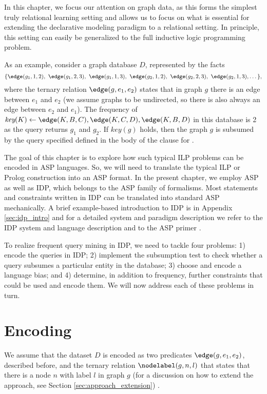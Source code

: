 In this chapter, we focus our attention on graph data, as this forms the simplest truly relational learning setting and allows us to focus on what is essential for extending the declarative modeling paradigm to a relational setting. In principle, this setting can easily be generalized to the full inductive logic programming problem. 
 
As an example, consider a graph database $D$, represented by the facts 
\begin{equation*}
\{ \edge(g_1,1,2),~ \edge(g_1,2,3),~ \edge(g_1,1,3),~ \edge(g_2,1,2),~ \edge(g_2,2,3),~ \edge(g_2,1,3), \dots \},
\end{equation*}
where the ternary relation $\edge(g,e_1,e_2)$ states that in graph $g$ there is an edge between $e_1$ and $e_2$ (we assume graphs to be undirected, so there is also always an edge between $e_2$ and $e_1$). The frequency of $\textit{key}(K) \leftarrow \edge(K,B,C), \edge(K,C,D), \edge(K,B,D)$ in this database is 2 as the query returns $g_1$ and $g_2$. If $key(g)$ holds,  then the graph $g$ is subsumed by the query specified defined in the body of the clause for \keypred.

The goal of this chapter is to explore how such typical ILP problems can be encoded in 
ASP languages.   So, we will need to translate the typical ILP or Prolog construction into an ASP format. 
In the present chapter, we employ ASP as well as IDP, which belongs to the ASP family of formalisms. Most statements and constraints written in IDP can be translated into standard ASP mechanically. %
A brief example-based introduction to IDP is in Appendix \ref{sec:idp_intro} and for a detailed system and paradigm description we refer to the IDP system and language description \parencite{idp} and to the ASP primer \parencite{eiter}.

To realize frequent query mining in IDP, we need to tackle four problems: 1) encode the queries in IDP; 2) implement the subsumption test to check whether a query subsumes a particular entity in the database; 3) choose and encode a language bias; and 4) determine, in addition to frequency, further constraints that could be used and encode them. We will now address each of these problems in turn.

\section{Encoding}\label{sec:encoding}
We assume that the dataset $D$ is encoded as two predicates $\edge(g,e_1,e_2)$, described before, and the ternary relation $\nodelabel(g,n,l)$ that states that there is a node $n$ with label $l$ in graph $g$ (for a discussion on how to extend the approach, see Section \ref{sec:approach_extension}) . 

